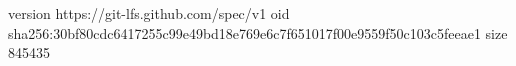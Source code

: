 version https://git-lfs.github.com/spec/v1
oid sha256:30bf80cdc6417255c99e49bd18e769e6c7f651017f00e9559f50c103c5feeae1
size 845435
